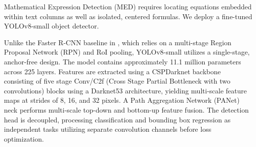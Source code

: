 \documentclass[conference]{IEEEtran}
\begin{document}
Mathematical Expression Detection (MED) requires locating equations embedded within text columns as well as isolated, centered formulas. We deploy a fine-tuned YOLOv8-small object detector. 

Unlike the Faster R-CNN baseline in \cite{ref_paper}, which relies on a multi-stage Region Proposal Network (RPN) and RoI pooling, YOLOv8-small utilizes a single-stage, anchor-free design. The model contains approximately 11.1 million parameters across 225 layers. Features are extracted using a CSPDarknet backbone consisting of five stage Conv/C2f (Cross Stage Partial Bottleneck with two convolutions) blocks using a Darknet53 architecture, yielding multi-scale feature maps at strides of 8, 16, and 32 pixels. A Path Aggregation Network (PANet) neck performs multi-scale top-down and bottom-up feature fusion. The detection head is decoupled, processing classification and bounding box regression as independent tasks utilizing separate convolution channels before loss optimization.
\end{document}
